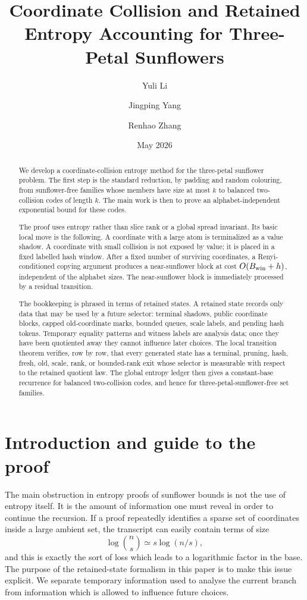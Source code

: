 \documentclass[11pt]{article}
\title{Coordinate Collision and Retained Entropy Accounting for Three-Petal Sunflowers}
\author{Yuli Li \and Jingping Yang \and Renhao Zhang}
\date{May 2026}
\theoremstyle{remark}
\begin{document}
\maketitle

\begin{abstract}
We develop a coordinate-collision entropy method for the three-petal sunflower problem.  The first step is the standard reduction, by padding and random colouring, from sunflower-free families whose members have size at most $k$ to balanced two-collision codes of length $k$.  The main work is then to prove an alphabet-independent exponential bound for these codes.

The proof uses entropy rather than slice rank or a global spread invariant.  Its basic local move is the following.  A coordinate with a large atom is terminalized as a value shadow.  A coordinate with small collision is not exposed by value; it is placed in a fixed labelled hash window.  After a fixed number of surviving coordinates, a Renyi-conditioned copying argument produces a near-sunflower block at cost $O(B_{\rm win}+h)$, independent of the alphabet sizes.  The near-sunflower block is immediately processed by a residual transition.

The bookkeeping is phrased in terms of retained states.  A retained state records only data that may be used by a future selector: terminal shadows, public coordinate blocks, capped old-coordinate marks, bounded queues, scale labels, and pending hash tokens.  Temporary equality patterns and witness labels are analysis data; once they have been quotiented away they cannot influence later choices.  The local transition theorem verifies, row by row, that every generated state has a terminal, pruning, hash, fresh, old, scale, rank, or bounded-rank exit whose selector is measurable with respect to the retained quotient law.  The global entropy ledger then gives a constant-base recurrence for balanced two-collision codes, and hence for three-petal-sunflower-free set families.
\end{abstract}

\section{Introduction and guide to the proof}\label{sec:introduction}

The main obstruction in entropy proofs of sunflower bounds is not the use of
entropy itself.  It is the amount of information one must reveal in order to
continue the recursion.  If a proof repeatedly identifies a sparse set of
coordinates inside a large ambient set, the transcript can easily contain terms
of size
\[
        \log\binom{n}{s}\simeq s\log(n/s),
\]
and this is exactly the sort of loss which leads to a logarithmic factor in the
base.  The purpose of the retained-state formalism in this paper is to make
this issue explicit.  We separate temporary information used to analyse the
current branch from information which is allowed to influence future choices.
\end{document}
